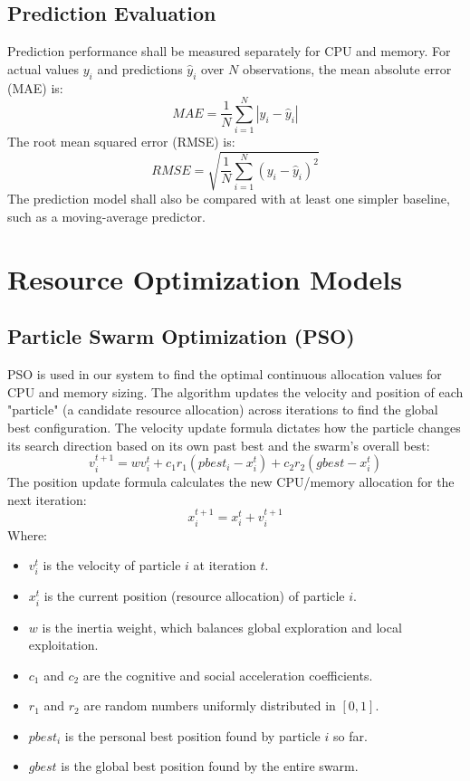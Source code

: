 \documentclass[12pt,a4paper]{report}
\begin{document}
\subsection{Prediction Evaluation}
Prediction performance shall be measured separately for CPU and memory. For actual values $y_{i}$ and predictions $\hat{y}_{i}$ over $N$ observations, the mean absolute error (MAE) is:
\begin{equation}
MAE = \frac{1}{N} \sum_{i=1}^{N} |y_{i} - \hat{y}_{i}|
\end{equation}
The root mean squared error (RMSE) is:
\begin{equation}
RMSE = \sqrt{\frac{1}{N} \sum_{i=1}^{N} (y_{i} - \hat{y}_{i})^{2}}
\end{equation}
The prediction model shall also be compared with at least one simpler baseline, such as a moving-average predictor.

\section{Resource Optimization Models}
\subsection{Particle Swarm Optimization (PSO)}
PSO is used in our system to find the optimal continuous allocation values for CPU and memory sizing. The algorithm updates the velocity and position of each "particle" (a candidate resource allocation) across iterations to find the global best configuration.
The velocity update formula dictates how the particle changes its search direction based on its own past best and the swarm's overall best:
\begin{equation}
v_{i}^{t+1}=w v_{i}^{t}+c_{1}r_{1}(pbest_{i}-x_{i}^{t})+c_{2}r_{2}(gbest-x_{i}^{t})
\end{equation}
The position update formula calculates the new CPU/memory allocation for the next iteration:
\begin{equation}
x_{i}^{t+1}=x_{i}^{t}+v_{i}^{t+1}
\end{equation}
Where:
\begin{itemize}
    \item $v_{i}^{t}$ is the velocity of particle $i$ at iteration $t$.
    \item $x_{i}^{t}$ is the current position (resource allocation) of particle $i$.
    \item $w$ is the inertia weight, which balances global exploration and local exploitation.
    \item $c_{1}$ and $c_{2}$ are the cognitive and social acceleration coefficients.
    \item $r_{1}$ and $r_{2}$ are random numbers uniformly distributed in $[0, 1]$.
    \item $pbest_{i}$ is the personal best position found by particle $i$ so far.
    \item $gbest$ is the global best position found by the entire swarm.
\end{itemize}
\lipsum[53-56]
\end{document}
